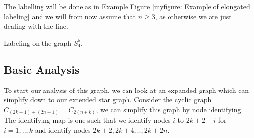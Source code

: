 \documentclass[a4paper,10pt]{article}
\theoremstyle{definition}
\theoremstyle{definition}
\theoremstyle{remark}
\theoremstyle{definition}
\begin{document}
The labelling will be done as in Example Figure \ref{myfigure: Example of elongated labeling} and we will from now assume that $n \geq 3$, as otherwise we are just dealing with the line.


\begin{myfigure}
\begin{center}
\end{center}
\caption{Labeling on the graph $S_{4}^5$.}
\label{myfigure: Example of elongated labeling}
\end{myfigure}

\subsection{Basic Analysis}
To start our analysis of this graph, we can look at an expanded graph which can simplify down to our extended star graph. Consider the cyclic graph $C_{(2k+1)+(2n-1)}=C_{2(n+k)}$, we can simplify this graph by node identifying. The identifying map is one such that we identify nodes $i$ to $2k+2-i$ for $i=1,..,k$ and identify nodes $2k+2,2k+4,..,2k+2n$.
\end{document}
